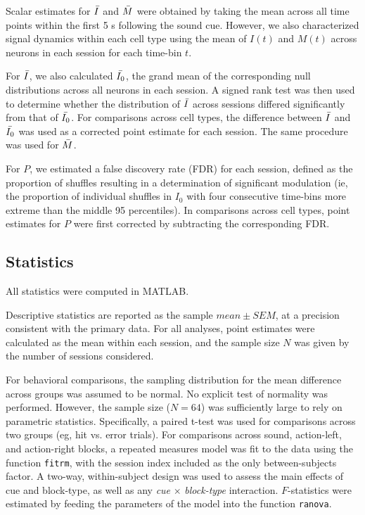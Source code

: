 Scalar estimates for $\Bar{I}$ and $\Bar{M}$ were obtained by taking the mean across all time points within the first 5 s following the sound cue. However, we also characterized signal dynamics within each cell type using the mean of ${I}(t)$ and ${M}(t)$ across neurons in each session for each time-bin $t$. 

For $\Bar{I}$, we also calculated $\Bar{I_0}$, the grand mean of the corresponding null distributions across all neurons in each session. A signed rank test was then used to determine whether the distribution of $\Bar{I}$ across sessions differed significantly from that of $\Bar{I_0}$. For comparisons across cell types, the difference between $\Bar{I}$ and $\Bar{I_0}$ was used as a corrected point estimate for each session. The same procedure was used for $\Bar{M}$.

For $P$, we estimated a false discovery rate (FDR) for each session, defined as the proportion of shuffles resulting in a determination of significant modulation (ie, the proportion of individual shuffles in $I_0$ with four consecutive time-bins more extreme than the middle 95 percentiles). In comparisons across cell types, point estimates for $P$ were first corrected by subtracting the corresponding FDR.  

\subsection*{Statistics}
All statistics were computed in MATLAB.

Descriptive statistics are reported as the sample $mean \pm SEM$, at a precision consistent with the primary data. For all analyses, point estimates were calculated as the mean within each session, and the sample size $N$ was given by the number of sessions considered. 

For behavioral comparisons, the sampling distribution for the mean difference across groups was assumed to be normal. No explicit test of normality was performed. However, the sample size  ($N=64$) was sufficiently large to rely on parametric statistics. Specifically, a paired t-test was used for comparisons across two groups (eg, hit vs. error trials). For comparisons across sound, action-left, and action-right blocks, a repeated measures model was fit to the data using the function \texttt{fitrm}, with the session index included as the only between-subjects factor. A two-way, within-subject design was used to assess the main effects of cue and block-type, as well as any \emph{cue} $\times$ \emph{block-type} interaction. $F$-statistics were estimated by feeding the parameters of the model into the function \texttt{ranova}.

